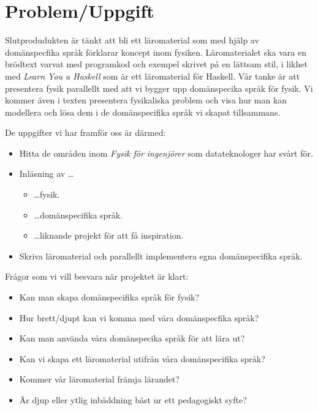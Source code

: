 \documentclass[12pt,a4paper]{article}
\begin{document}
\section{Problem/Uppgift}

Slutprodudukten är tänkt att bli ett läromaterial som med hjälp av domänspecfika språk förklarar koncept inom fysiken. Läromaterialet ska vara en brödtext varvat med programkod och exempel skrivet på en lättsam stil, i likhet med \textit{Learn You a Haskell}\cite{LYAH} som är ett läromaterial för Haskell. Vår tanke är att presentera fysik parallellt med att vi bygger upp domänspecika språk för fysik. Vi kommer även i texten presentera fysikaliska problem och visa hur man kan modellera och lösa dem i de domänspecifika språk vi skapat tillsammans.


De uppgifter vi har framför oss är därmed:

\begin{itemize}
	\item Hitta de områden inom \textit{Fysik för ingenjörer} som datateknologer har svårt för.
	\item Inläsning av \dots
	\begin{itemize}
		\item \dots fysik.
		\item \dots domänspecifika språk.
		\item \dots liknande projekt för att få inspiration.
	\end{itemize}
	\item Skriva läromaterial och parallellt implementera egna domänspecifika språk.
\end{itemize}


Frågor som vi vill besvara när projektet är klart:
\begin{itemize}
    \item Kan man skapa domänspecifika språk för fysik?
    \item Hur brett/djupt kan vi komma med våra domänspecfika språk?
    \item Kan man använda våra domänspecika språk för att lära ut?
    \item Kan vi skapa ett läromaterial utifrån våra domänspecifika språk?
    \item Kommer vår läromaterial främja lärandet?
    \item Är djup eller ytlig inbäddning bäst ur ett pedagogiskt syfte?
\end{itemize}
\end{document}
